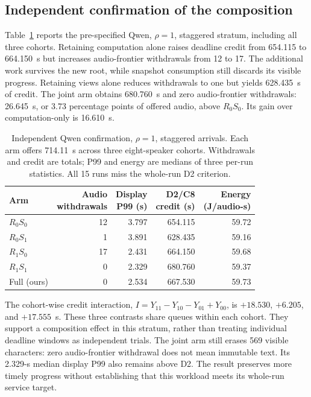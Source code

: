 \subsection{Independent confirmation of the composition}
Table~\ref{tab:core-h3} reports the pre-specified Qwen, $\rho=1$,
staggered stratum, including all three cohorts. Retaining computation
alone raises deadline credit from 654.115 to 664.150~s but increases
audio-frontier withdrawals from 12 to 17. The additional work survives
the new root, while snapshot consumption still discards its visible
progress. Retaining views alone reduces withdrawals to one but yields
628.435~s of credit. The joint arm obtains 680.760~s and zero
audio-frontier withdrawals: 26.645~s, or 3.73 percentage points of offered
audio, above $R_0S_0$. Its gain over computation-only
is 16.610~s.

\begin{table}[t]
\centering
\caption{Independent Qwen confirmation, $\rho=1$, staggered arrivals.
Each arm offers 714.11~s across three eight-speaker cohorts.
Withdrawals and credit are totals; P99 and energy are medians of three
per-run statistics. All 15 runs miss the whole-run D2 criterion.}
\label{tab:core-h3}
\begingroup
\small
\setlength{\tabcolsep}{3pt}
\begin{tabular}{@{}lrrrr@{}}
\toprule
Arm & \shortstack{Audio\\withdrawals} &
\shortstack{Display\\P99 (s)} & \shortstack{D2/C8\\credit (s)} &
\shortstack{Energy\\(J/audio-s)}\\
\midrule
$R_0S_0$ & 12 & 3.797 & 654.115 & 59.72\\
$R_0S_1$ & 1 & 3.891 & 628.435 & 59.16\\
$R_1S_0$ & 17 & 2.431 & 664.150 & 59.68\\
$R_1S_1$ & 0 & 2.329 & 680.760 & 59.37\\
Full (ours) & 0 & 2.534 & 667.530 & 59.73\\
\bottomrule
\end{tabular}
\endgroup
\end{table}

The cohort-wise credit interaction,
$I=Y_{11}-Y_{10}-Y_{01}+Y_{00}$, is
$+18.530$, $+6.205$, and $+17.555$~s. These three contrasts share queues
within each cohort. They support a composition effect
in this stratum, rather than treating individual deadline windows as
independent trials. The joint arm still erases 569 visible characters:
zero audio-frontier withdrawal does not mean immutable text.
Its 2.329-s median display P99 also remains above D2. The result preserves
more timely progress without establishing that this workload meets its
whole-run service target.

